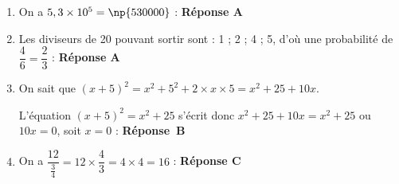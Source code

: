 
\medskip

\begin{enumerate}
\item On a $5,3 \times 10^5 = \np{530000}$ : \textbf{Réponse A}
\item Les diviseurs de 20 pouvant sortir sont : 1 ; 2 ; 4 ; 5, d'où une probabilité de $\dfrac{4}{6} = \dfrac{2}{3}$ : \textbf{Réponse A}
\item On sait que $(x + 5)^2 = x^2 + 5^2 + 2 \times x \times 5 = x^2 + 25 + 10x$.

L'équation $(x + 5)^2 = x^2 + 25$ s'écrit donc $x^2 + 25 + 10x = x^2 + 25$ ou $10x = 0$, soit $x = 0$ : \textbf{Réponse~B}
\item On a $\dfrac{12}{\frac{3}{4}} = 12 \times \dfrac{4}{3} = 4 \times 4 = 16$ : \textbf{Réponse C}
\end{enumerate}

\bigskip

